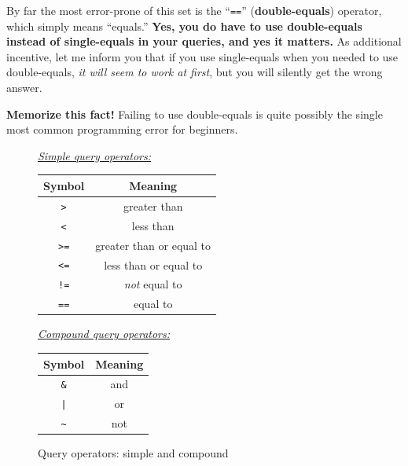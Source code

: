 
By far the most error-prone of this set is the ``\texttt{==}''
(\textbf{double-equals}) operator, which simply means ``equals.'' \textbf{Yes,
you do have to use double-equals instead of single-equals in your queries, and
yes it matters.} As additional incentive, let me inform you that if you use
single-equals when you needed to use double-equals, \textit{it will seem to
work at first}, but you will silently get the wrong answer.

\textbf{Memorize this fact!} Failing to use double-equals is quite possibly the
single most common programming error for beginners.

\begin{figure}[ht]
\centering
\small
\bigskip
\underline{\textit{Simple query operators:}}\\
\smallskip
\begingroup
\par\tagpdfparaOff
{}
\begin{tabular}{c|c}
Symbol & Meaning \\
\hline
\texttt{>} & greater than \\
\hline
\texttt{<} & less than \\
\hline
\texttt{>=} & greater than or equal to \\
\hline
\texttt{<=} & less than or equal to \\
\hline
\texttt{!=} & \textit{not} equal to \\
\hline
\texttt{==} & equal to \\
\end{tabular}\par
\endgroup

\bigskip
\bigskip
\underline{\textit{Compound query operators:}}\\
\smallskip
\begingroup
\par\tagpdfparaOff
{}
\begin{tabular}{c|c}
Symbol & Meaning \\
\hline
\texttt{\&} & and \\
\hline
\texttt{|} & or \\
\hline
\texttt{\textasciitilde} & not \\
\end{tabular}\par
\endgroup

\bigskip
\normalsize
\caption{Query operators: simple and compound}
\label{fig:queryOps}
\end{figure}


